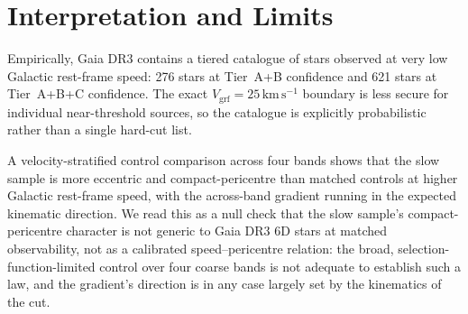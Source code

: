 \documentclass{aa}  %
\newcommand{\vgrf}{\ensuremath{V_{\mathrm{grf}}}\xspace}
\newcommand{\kms}{\ensuremath{\,\mathrm{km\,s^{-1}}}\xspace}
\begin{document}
\section{Interpretation and Limits} \label{sec:interpretation}

Empirically, Gaia DR3 contains a
tiered catalogue of stars observed at very low Galactic rest-frame speed:
276 stars at Tier~A+B confidence and 621 stars at Tier~A+B+C confidence.
The exact $\vgrf=25$\kms{} boundary is less secure for individual
near-threshold sources, so the catalogue is explicitly probabilistic
rather than a single hard-cut list.

A velocity-stratified control comparison across four bands shows that the
slow sample is more eccentric and compact-pericentre than matched controls
at higher Galactic rest-frame speed, with the across-band gradient running
in the expected kinematic direction.  We read this as a null check that the
slow sample's compact-pericentre character is not generic to Gaia DR3 6D
stars at matched observability, not as a calibrated speed--pericentre
relation: the broad, selection-function-limited control over four coarse
bands is not adequate to establish such a law, and the gradient's direction
is in any case largely set by the kinematics of the cut.
\end{document}
